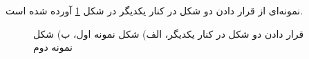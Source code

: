 نمونه‌ای از قرار دادن دو شکل در کنار یکدیگر در شکل
\ref{Fig:SampleFigure2}
آورده شده است.

\begin{figure}[!htb]
\centering
{}
\quad
{}
\caption{
قرار دادن دو شکل در کنار یکدیگر، الف) شکل نمونه اول،
ب) شکل نمونه دوم
}
\label{Fig:SampleFigure2}
\end{figure}





